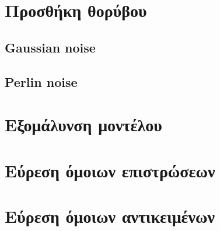 \documentclass{article}
\begin{document}
\section{Προσθήκη θορύβου}

\subsection{Gaussian noise}

\subsection{Perlin noise}


\section{Εξομάλυνση μοντέλου}


\section{Εύρεση όμοιων επιστρώσεων}


\section{Εύρεση όμοιων αντικειμένων}

\end{document}
